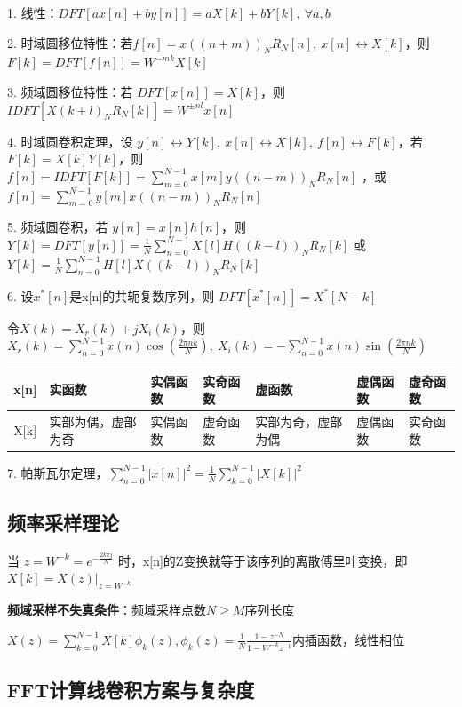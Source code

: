 1. 线性：$DFT[ax[n]+by[n]]=aX[k]+bY[k], \ \forall a,b$

2. 时域圆移位特性：若$f[n]=x((n+m))_NR_N[n], \ x[n]\leftrightarrow X[k]$，则 $F[k]=DFT[f[n]]=W^{-mk}X[k]$

3. 频域圆移位特性：若 $DFT[x[n]]=X[k]$，则 $IDFT[X(k\pm l)_NR_N[k]]=W^{\pm nl}x[n]$

4. 时域圆卷积定理，设 $y[n]\leftrightarrow Y[k], \ x[n]\leftrightarrow X[k], \ f[n]\leftrightarrow F[k]$，若$F[k]=X[k]Y[k]$，则 $f[n]=IDFT[F[k]]=\sum\limits^{N-1}_{m=0} x[m]y((n-m))_NR_N[n]$ ，或$f[n]=\sum\limits^{N-1}_{m=0}y[m]x((n-m))_NR_N[n]$

5. 频域圆卷积，若 $y[n]=x[n]h[n]$，则 $Y[k]=DFT[y[n]]=\frac{1}{N}\sum\limits^{N-1}_{n=0}X[l]H((k-l))_NR_N[k]$ 或 $Y[k]=\frac{1}{N} \sum\limits^{N-1}_{n=0}H[l]X((k-l))_NR_N[k]$

6. 设$x^*[n]$是x[n]的共轭复数序列，则 $DFT[x^*[n]]=X^*[N-k]$
   
   令$X(k)=X_r(k)+jX_i(k)$，则 $X_r(k)=\sum\limits_{n=0}^{N-1}x(n)\cos(\frac{2\pi nk}{N}), \ X_i(k)=-\sum\limits^{N-1}_{n=0}x(n)\sin(\frac{2\pi nk}{N})$

\begin{center}
\begin{tabularx}{\columnwidth}{|c|X|X|X|X|X|X|}
\hline
x[n] & 实函数 & 实偶函数 & 实奇函数 & 虚函数 & 虚偶函数 & 虚奇函数 \\
\hline
X[k] & 实部为偶，虚部为奇 & 实偶函数 & 虚奇函数 & 实部为奇，虚部为偶 & 虚偶函数 & 实奇函数 \\
\hline
\end{tabularx}
\end{center}

7. 帕斯瓦尔定理，$\sum\limits^{N-1}_{n=0}|x[n]|^2=\frac{1}{N}\sum\limits^{N-1}_{k=0}|X[k]|^2$

\subsection*{频率采样理论}

当 $z=W^{-k}=e^{-\frac{2k\pi j}{N}}$ 时，x[n]的Z变换就等于该序列的离散傅里叶变换，即$X[k]=X(z)|_{z=W^{-k}}$

\textbf{频域采样不失真条件}：频域采样点数$N\geq M$序列长度

$X(z)=\sum_{k=0}^{N-1}X[k]\phi_k(z), \phi_k(z)=\frac{1}{N}\frac{1-z^{-N}}{1-W^{-k}z^{-1}}$内插函数，线性相位

\subsection*{FFT计算线卷积方案与复杂度}

